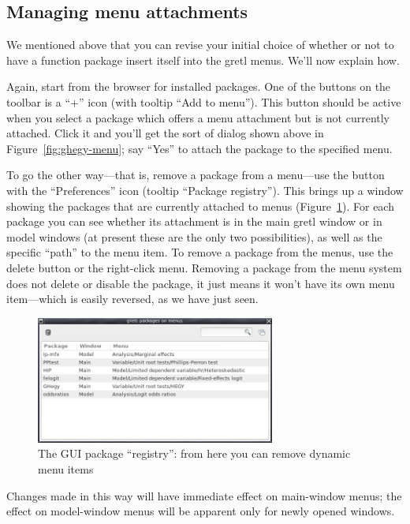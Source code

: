\documentclass[oneside]{book}
\begin{document}
\subsection{Managing menu attachments}
\label{manage-menus}

We mentioned above that you can revise your initial choice of whether
or not to have a function package insert itself into the gretl
menus. We'll now explain how.

Again, start from the browser for installed packages. One of the
buttons on the toolbar is a ``\textsf{+}'' icon (with tooltip ``Add to
menu''). This button should be active when you select a package which
offers a menu attachment but is not currently attached. Click it and
you'll get the sort of dialog shown above in
Figure~\ref{fig:ghegy-menu}; say ``Yes'' to attach the package to the
specified menu.

To go the other way---that is, remove a package from a menu---use the
button with the ``Preferences'' icon (tooltip ``Package
registry''). This brings up a window showing the packages that are
currently attached to menus (Figure~\ref{fig:pkg-registry}). For each
package you can see whether its attachment is in the main gretl window
or in model windows (at present these are the only two possibilities),
as well as the specific ``path'' to the menu item. To remove a package
from the menus, use the delete button or the right-click
menu. Removing a package from the menu system does not delete or
disable the package, it just means it won't have its own menu
item---which is easily reversed, as we have just seen.

\begin{figure}[htbp]
  \centering
  \includegraphics[width=0.7\textwidth]{figures/pkg-registry}
  \caption{The GUI package ``registry'': from here you can remove
    dynamic menu items}
  \label{fig:pkg-registry}
\end{figure}

Changes made in this way will have immediate effect on main-window
menus; the effect on model-window menus will be apparent only for
newly opened windows.
\end{document}
